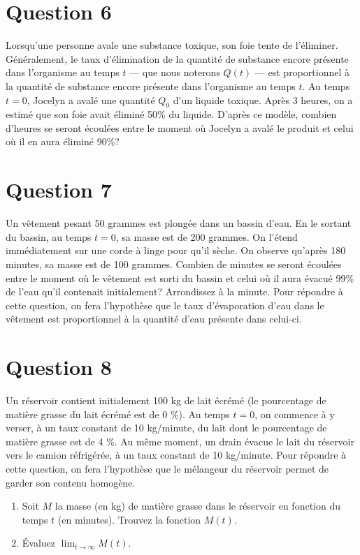 \documentclass[
  12pt,
  letterpaper,
]{book}
\providecommand{\tightlist}{%
  \setlength{\itemsep}{0pt}\setlength{\parskip}{0pt}}\usepackage{longtable,booktabs,array}
\theoremstyle{remark}
\begin{document}
\section{Question 6}\label{question-6}

Lorsqu'une personne avale une substance toxique, son foie tente de
l'éliminer. Généralement, le taux d'élimination de la quantité de
substance encore présente dans l'organisme au temps \(t\) --- que nous
noterons \(Q(t)\) --- est proportionnel à la quantité de substance
encore présente dans l'organisme au temps \(t\). Au temps \(t=0\),
Jocelyn a avalé une quantité \(Q_0\) d'un liquide toxique. Après 3
heures, on a estimé que son foie avait éliminé 50\% du liquide. D'après
ce modèle, combien d'heures se seront écoulées entre le moment où
Jocelyn a avalé le produit et celui où il en aura éliminé 90\%?

\section{Question 7}\label{question-7}

Un vêtement pesant 50 grammes est plongée dans un bassin d'eau. En le
sortant du bassin, au temps \(t=0\), sa masse est de 200 grammes. On
l'étend immédiatement sur une corde à linge pour qu'il sèche. On observe
qu'après 180 minutes, sa masse est de 100 grammes. Combien de minutes se
seront écoulées entre le moment où le vêtement est sorti du bassin et
celui où il aura évacué 99\% de l'eau qu'il contenait initialement?
Arrondissez à la minute. Pour répondre à cette question, on fera
l'hypothèse que le taux d'évaporation d'eau dans le vêtement est
proportionnel à la quantité d'eau présente dans celui-ci.

\section{Question 8}\label{question-8}

Un réservoir contient initialement 100 kg de lait écrémé (le pourcentage
de matière grasse du lait écrémé est de 0 \%). Au temps \(t=0\), on
commence à y verser, à un taux constant de 10 kg/minute, du lait dont le
pourcentage de matière grasse est de 4 \%. Au même moment, un drain
évacue le lait du réservoir vers le camion réfrigérée, à un taux
constant de 10 kg/minute. Pour répondre à cette question, on fera
l'hypothèse que le mélangeur du réservoir permet de garder son contenu
homogène.

\begin{enumerate}
\tightlist
\item
  Soit \(M\) la masse (en kg) de matière grasse dans le réservoir en
  fonction du temps \(t\) (en minutes). Trouvez la fonction \(M(t)\).
\item
  Évaluez \(\lim_{t\rightarrow\infty}M(t)\).
\end{enumerate}
\end{document}
